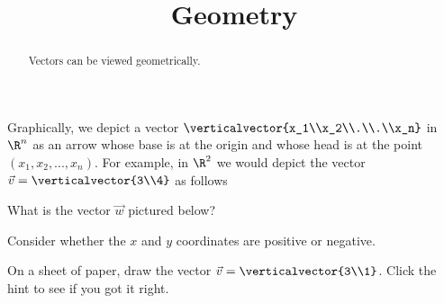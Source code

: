 \documentclass{ximera}
\title{Geometry}
\begin{document}
\begin{abstract}
  Vectors can be viewed geometrically.
\end{abstract}
\maketitle


Graphically, we depict a vector $\verticalvector{x_1\\x_2\\.\\.\\x_n}$
in $\R^n$ as an arrow whose base is at the origin and whose head is at
the point $(x_1,x_2,...,x_n)$.  For example, in $\R^2$ we would depict
the vector $\vec{v} = \verticalvector{3\\4}$ as follows


\begin{question}
  What is the vector $\vec{w}$ pictured below?

  \begin{solution}
    \begin{hint}
      Consider whether the $x$ and $y$ coordinates are positive or negative.
    \end{hint}
    \begin{multiple-choice}
    \end{multiple-choice}
  \end{solution}
\end{question}
  	 
\begin{question}
  \begin{hint}
  \end{hint}
  On a sheet of paper, draw the vector $\vec{v} = \verticalvector{3\\1}$. Click the hint to see if you got it right.
  
\end{question}
  	 
\end{document}
